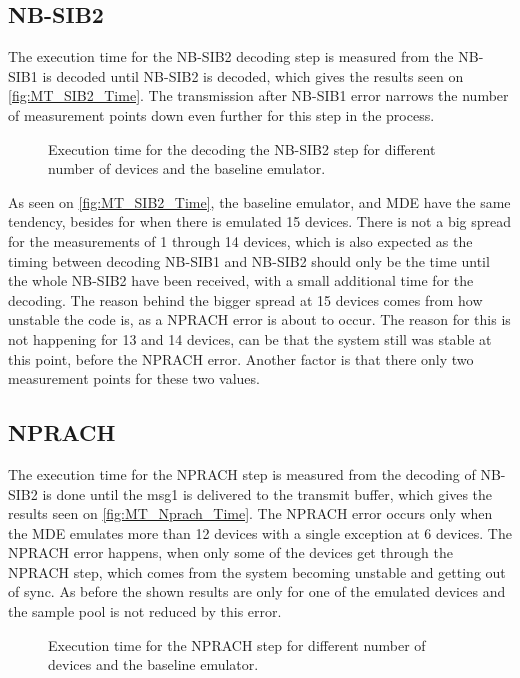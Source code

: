 \subsection{NB-SIB2}
The execution time for the NB-SIB2 decoding step is measured from the NB-SIB1 is decoded until NB-SIB2 is decoded, which gives the results seen on \autoref{fig:MT_SIB2_Time}. The transmission after NB-SIB1 error narrows the number of measurement points down even further for this step in the process.

\begin{figure}[H]
\centering

\caption{Execution time for the decoding the NB-SIB2 step for different number of devices and the baseline emulator.}
\label{fig:MT_SIB2_Time}
\end{figure}


As seen on \autoref{fig:MT_SIB2_Time}, the baseline emulator, and MDE have the same tendency, besides for when there is emulated 15 devices. There is not a big spread for the measurements of 1 through 14 devices, which is also expected as the timing between decoding NB-SIB1 and NB-SIB2 should only be the time until the whole NB-SIB2 have been received, with a small additional time for the decoding. The reason behind the bigger spread at 15 devices comes from how unstable the code is, as a NPRACH error is about to occur. The reason for this is not happening for 13 and 14 devices, can be that the system still was stable at this point, before the NPRACH error. Another factor is that there only two measurement points for these two values.


\subsection{NPRACH}
The execution time for the NPRACH step is measured from the decoding of NB-SIB2 is done until the msg1 is delivered to the transmit buffer, which gives the results seen on \autoref{fig:MT_Nprach_Time}. The NPRACH error occurs only when the MDE emulates more than 12 devices with a single exception at 6 devices. The NPRACH error happens, when only some of the devices get through the NPRACH step, which comes from the system becoming unstable and getting out of sync. As before the shown results are only for one of the emulated devices and the sample pool is not reduced by this error.

\begin{figure}[H]
\centering
\resizebox{0.5\textwidth}{!}{
}
\caption{Execution time for the NPRACH step for different number of devices and the baseline emulator.}
\label{fig:MT_Nprach_Time}
\end{figure}

